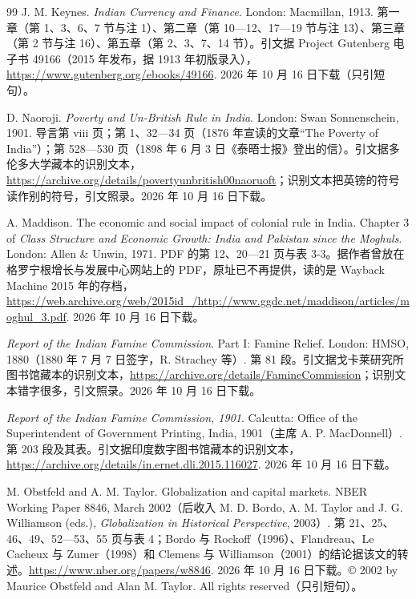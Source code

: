 \begin{thebibliography}{99}
 J. M. Keynes. \emph{Indian Currency and Finance}. London: Macmillan, 1913. 第一章（第 1、3、6、7 节与注 1）、第二章（第 10—12、17—19 节与注 13）、第三章（第 2 节与注 16）、第五章（第 2、3、7、14 节）。引文据 Project Gutenberg 电子书 49166（2015 年发布，据 1913 年初版录入），\url{https://www.gutenberg.org/ebooks/49166}. 2026 年 10 月 16 日下载（只引短句）。

 D. Naoroji. \emph{Poverty and Un-British Rule in India}. London: Swan Sonnenschein, 1901. 导言第 viii 页；第 1、32—34 页（1876 年宣读的文章“The Poverty of India”）；第 528—530 页（1898 年 6 月 3 日《泰晤士报》登出的信）。引文据多伦多大学藏本的识别文本，\url{https://archive.org/details/povertyunbritish00naoruoft}；识别文本把英镑的符号读作别的符号，引文照录。2026 年 10 月 16 日下载。

 A. Maddison. The economic and social impact of colonial rule in India. Chapter 3 of \emph{Class Structure and Economic Growth: India and Pakistan since the Moghuls}. London: Allen \& Unwin, 1971. PDF 的第 12、20—21 页与表 3-3。据作者曾放在格罗宁根增长与发展中心网站上的 PDF，原址已不再提供，读的是 Wayback Machine 2015 年的存档，\url{https://web.archive.org/web/2015id_/http://www.ggdc.net/maddison/articles/moghul_3.pdf}. 2026 年 10 月 16 日下载。

 \emph{Report of the Indian Famine Commission}. Part I: Famine Relief. London: HMSO, 1880（1880 年 7 月 7 日签字，R. Strachey 等）. 第 81 段。引文据戈卡莱研究所图书馆藏本的识别文本，\url{https://archive.org/details/FamineCommission}；识别文本错字很多，引文照录。2026 年 10 月 16 日下载。

 \emph{Report of the Indian Famine Commission, 1901}. Calcutta: Office of the Superintendent of Government Printing, India, 1901（主席 A. P. MacDonnell）. 第 203 段及其表。引文据印度数字图书馆藏本的识别文本，\url{https://archive.org/details/in.ernet.dli.2015.116027}. 2026 年 10 月 16 日下载。

 M. Obstfeld and A. M. Taylor. Globalization and capital markets. NBER Working Paper 8846, March 2002（后收入 M. D. Bordo, A. M. Taylor and J. G. Williamson (eds.), \emph{Globalization in Historical Perspective}, 2003）. 第 21、25、46、49、52—53、55 页与表 4；Bordo 与 Rockoff（1996）、Flandreau、Le Cacheux 与 Zumer（1998）和 Clemens 与 Williamson（2001）的结论据该文的转述。\url{https://www.nber.org/papers/w8846}. 2026 年 10 月 16 日下载。© 2002 by Maurice Obstfeld and Alan M. Taylor. All rights reserved（只引短句）。


\end{thebibliography}
